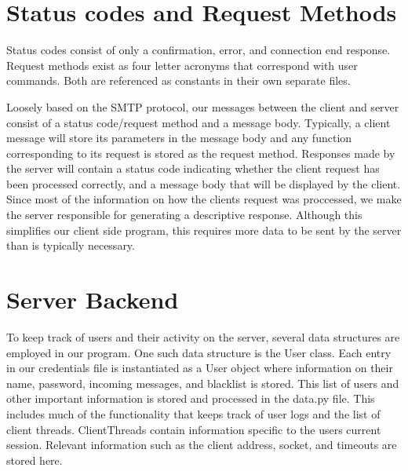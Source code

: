 \documentclass[12pt, ]{article}
\begin{document}
\maketitle
\section{Status codes and Request Methods}

\begin{flushleft}
	Status codes consist of only a confirmation, error, and connection end response. Request methods exist as four letter acronyms that correspond with user commands. Both are referenced as constants in their own separate files.
\end{flushleft}

\begin{flushleft}
	Loosely based on the SMTP protocol, our messages between the client and server consist of a status code/request method and a message body. 
	Typically, a client message will store its parameters in the message body and any function corresponding to its request is stored as the request method.
	Responses made by the server will contain a status code indicating whether the client request has been processed correctly, and a message body that will be displayed by the client.
	Since most of the information on how the clients request was proccessed, we make the server responsible for generating a descriptive response.
	Although this simplifies our client side program, this requires more data to be sent by the server than is typically necessary.
\end{flushleft}


\maketitle
\section{Server Backend}

\begin{flushleft}
	To keep track of users and their activity on the server, several data structures are employed in our program. One such data structure is the User class.
	Each entry in our credentials file is instantiated as a User object where information on their name, password, incoming messages, and blacklist is stored.
	This list of users and other important information is stored and processed in the data.py file. This includes much of the functionality that keeps track of user logs and the list of client threads.
	ClientThreads contain information specific to the users current session. Relevant information such as the client address, socket, and timeouts are stored here.
\end{flushleft}
\end{document}
